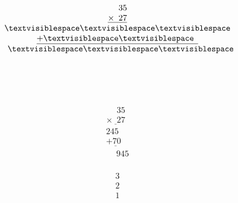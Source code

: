 \begin{minipage}[t]{0.3\linewidth}
\begin{align*}\begin{array}{c}
\phantom{
\times0
}
35\\
\underline{
\times
\phantom{
0
}
27
}\\
\textvisiblespace
\textvisiblespace
\textvisiblespace
\\
\underline{
+
\textvisiblespace
\textvisiblespace
\phantom0
}
\\
\phantom{+}
\textvisiblespace
\textvisiblespace
\textvisiblespace
\end{array}\end{align*}
\end{minipage}
\begin{minipage}[t]{0.05\linewidth}
\begin{align*}\begin{array}{c}
\textvisiblespace
\\
\textvisiblespace
\\
\textvisiblespace
\end{array}\end{align*}
\end{minipage}
\begin{minipage}[t]{0.3\linewidth}
\begin{align*}\begin{array}{c}
\phantom{
\times0
}
35\\
\underline{
\times
\phantom{
0
}
27
}\\
245
\\
\underline{
+
70
\phantom0
}
\\
\phantom{+}
945
\end{array}\end{align*}
\end{minipage}
\begin{minipage}[t]{0.05\linewidth}
\begin{align*}\begin{array}{c}
3
\\
2
\\
1
\end{array}\end{align*}
\end{minipage}

